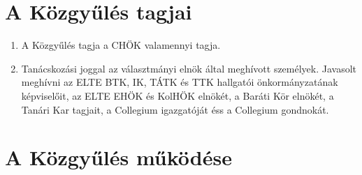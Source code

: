 \documentclass{../styles/rulebook}
\begin{document}
\section{A Közgyűlés tagjai}

\begin{enumerate}
	\item A Közgyűlés tagja a CHÖK valamennyi tagja.
	\item Tanácskozási joggal az választmányi elnök által meghívott személyek. Javasolt meghívni az ELTE BTK, IK, TÁTK és TTK hallgatói önkormányzatának képviselőit, az ELTE EHÖK és KolHÖK elnökét, a Baráti Kör elnökét, a Tanári Kar tagjait, a Collegium igazgatóját éss a Collegium gondnokát.
\end{enumerate}

\section{A Közgyűlés működése}
\end{document}
